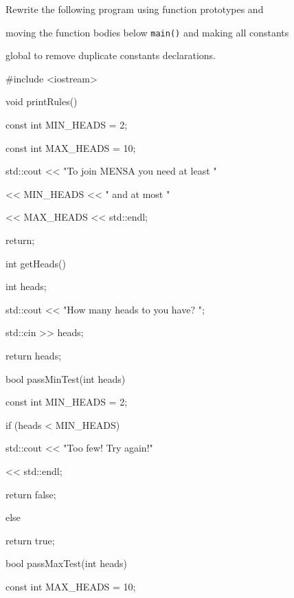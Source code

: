 Rewrite the following program using function prototypes and

moving the function bodies below \texttt{main()} and making all constants

global to remove duplicate constants declarations.

\begin{consolethree}[escapeinside=||]

#include <iostream>



void printRules()

{

    const int MIN_HEADS = 2;

    const int MAX_HEADS = 10;

    std::cout << "To join MENSA you need at least "

              << MIN_HEADS << " and at most "

              << MAX_HEADS << std::endl;

    return;

}



int getHeads()

{

    int heads;

    std::cout << "How many heads to you have? ";

    std::cin >> heads;

    return heads;

}



bool passMinTest(int heads)

{

    const int MIN_HEADS = 2;

    if (heads < MIN_HEADS)

    {

        std::cout << "Too few! Try again!"

                  << std::endl;

        return false;

    }

    else

        return true;

}



bool passMaxTest(int heads)

{

    const int MAX_HEADS = 10;

}
\end{consolethree}
